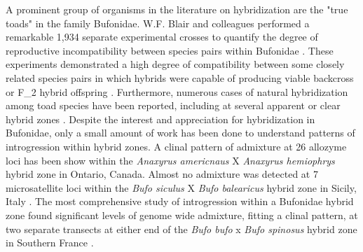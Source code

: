 A prominent group of organisms in the literature on hybridization are the "true
toads" in the family Bufonidae. 
W.F. Blair and colleagues performed a remarkable 1,934 separate experimental crosses 
to quantify the degree of reproductive incompatibility between species pairs within
Bufonidae \parencite{blair1972,malone2008}.
These experiments demonstrated a high degree of compatibility between some closely 
related species pairs in which hybrids were capable of producing viable backcross 
or F_2 hybrid offspring \parencite{blair1963}.
Furthermore, numerous cases of natural hybridization among toad species have been 
reported, including at several apparent or clear hybrid zones 
\parencite{green1996,vanriemsdijk2023,colliard2010,weatherby1982}.
Despite the interest and appreciation for hybridization in Bufonidae, only a 
small amount of work has been done to understand patterns of introgression
within hybrid zones. 
A clinal pattern of admixture at 26 allozyme loci has been show within the 
\textit{Anaxyrus americnaus} X \textit{Anaxyrus hemiophrys} hybrid zone in 
Ontario, Canada\parencite{green1983}.
Almost no admixture was detected at 7 microsatellite loci within the \textit{Bufo siculus} X 
\textit{Bufo balearicus} hybrid zone in Sicily, Italy \parencite{colliard2010}.
The most comprehensive study of introgression within a Bufonidae hybrid zone found 
significant levels of genome wide admixture, fitting a clinal pattern, at two separate transects 
at either end of the \textit{Bufo bufo} x \textit{Bufo spinosus} hybrid zone
in Southern France \parencite{vanriemsdijk2023}.

